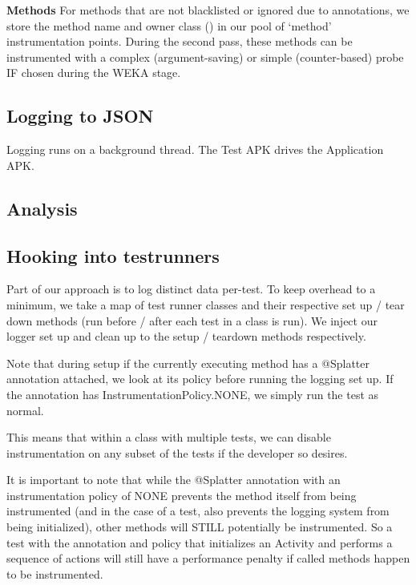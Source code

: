 \textbf{Methods}
For methods that are not blacklisted or ignored due to annotations, we store the method name and owner class () in our pool of {\lq}method{\rq} instrumentation points. During the second pass, these methods can be instrumented with a complex (argument-saving) or simple (counter-based) probe IF chosen during the WEKA stage.

\subsection{Logging to JSON}


Logging runs on a background thread. The Test APK drives the Application APK.

\subsection{Analysis}


\subsection{Hooking into testrunners}

Part of our approach is to log distinct data per-test. To keep overhead to a minimum, we take a map of test runner classes and their respective set up / tear down methods (run before / after each test in a class is run). We inject our logger set up and clean up to the setup / teardown methods respectively.

Note that during setup if the currently executing method has a @Splatter annotation attached, we look at its policy before running the logging set up. If the annotation has InstrumentationPolicy.NONE, we simply run the test as normal.

This means that within a class with multiple tests, we can disable instrumentation on any subset of the tests if the developer so desires.

It is important to note that while the @Splatter annotation with an instrumentation policy of NONE prevents the method itself from being instrumented (and in the case of a test, also prevents the logging system from being initialized), other methods will STILL potentially be instrumented. So a test with the annotation and policy that initializes an Activity and performs a sequence of actions will still have a performance penalty if called methods happen to be instrumented.

